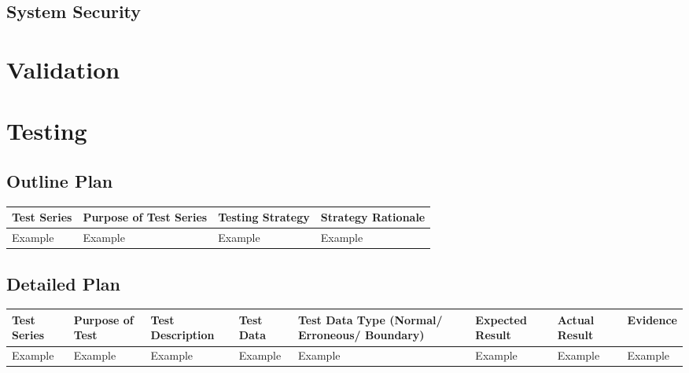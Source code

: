 \subsection{System Security}

\section{Validation}

\section{Testing}

\begin{landscape}
\subsection{Outline Plan}

\begin{center}
    \begin{tabular}{|p{2cm}|p{5cm}|p{5cm}|p{4cm}|}
        \hline
        \textbf{Test Series} & \textbf{Purpose of Test Series} & \textbf{Testing Strategy} & \textbf{Strategy Rationale}\\ \hline
        Example & Example & Example & Example \\ \hline
    \end{tabular}
\end{center}

\subsection{Detailed Plan}

\begin{center}
    \begin{longtable}{|p{1.5cm}|p{2.5cm}|p{2.5cm}|p{2cm}|p{2cm}|p{2cm}|p{2cm}|p{2cm}|}
        \hline
        \textbf{Test Series} & \textbf{Purpose of Test} & \textbf{Test Description} & \textbf{Test Data} & \textbf{Test Data Type (Normal/ Erroneous/ Boundary)} & \textbf{Expected Result} & \textbf{Actual Result} & \textbf{Evidence}\\ \hline
        Example & Example & Example & Example & Example & Example & Example & Example \\ \hline
    \end{longtable}
\end{center}
\end{landscape}